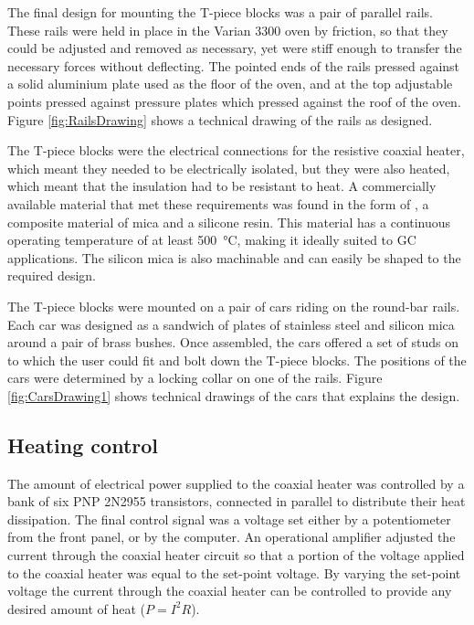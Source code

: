 The final design for mounting the T-piece blocks was a pair of parallel rails.
These rails were held in place in the Varian 3300 oven by friction, so that they
could be adjusted and removed as necessary, yet were stiff enough to transfer
the necessary forces without deflecting. The pointed ends of the rails pressed
against a solid aluminium plate used as the floor of the oven, and at the top
adjustable points pressed against pressure plates which pressed against the roof
of the oven. Figure \ref{fig:RailsDrawing} shows a technical drawing of the
rails as designed.

The T-piece blocks were the electrical connections for the resistive coaxial
heater, which meant they needed to be electrically isolated, but they were also
heated, which meant that the insulation had to be resistant to heat. A
commercially available material that met these requirements was found in the
form of , a composite material of mica and a silicone
resin. This material has a continuous operating temperature of at least
\SI{500}{\celsius}, making it ideally suited to GC applications. The silicon
mica is also machinable and can easily be shaped to the required design. 

The T-piece blocks were mounted on a pair of cars riding on the round-bar rails.
Each car was designed as a sandwich of plates of stainless steel and silicon
mica around a pair of brass bushes. Once assembled, the cars offered a set of
studs on to which the user could fit and bolt down the T-piece blocks. The
positions of the cars were determined by a locking collar on one of the rails.
Figure \ref{fig:CarsDrawing1} shows technical drawings of the cars that explains
the design.


\subsection{Heating control}

The amount of electrical power supplied to the coaxial heater was controlled by
a bank of six PNP 2N2955 transistors, connected in parallel to distribute their
heat dissipation. The final control signal was a voltage set either by a
potentiometer from the front panel, or by the computer. An operational amplifier
adjusted the current through the coaxial heater circuit so that a portion of the
voltage applied to the coaxial heater was equal to the set-point voltage. By
varying the set-point voltage the current through the coaxial heater can be
controlled to provide any desired amount of heat (\(P = I^2R\)).

